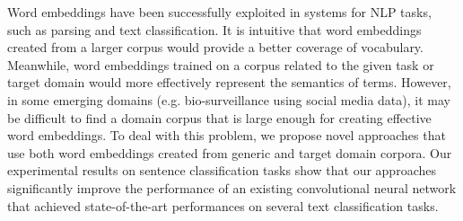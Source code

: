 Word embeddings have been successfully exploited in systems for NLP tasks, such as parsing and text classification. It is intuitive that word embeddings created from a larger corpus would provide a better coverage of vocabulary. Meanwhile, word embeddings trained on a corpus related to the given task or target domain would more effectively represent the semantics of terms. However, in some emerging domains (e.g. bio-surveillance using social media data), it may be difficult to find a domain corpus that is large enough for creating effective word embeddings. To deal with this problem, we propose novel approaches that use both word embeddings created from generic and target domain corpora. Our experimental results on sentence classification tasks show that our approaches significantly improve the performance of an existing convolutional neural network that achieved state-of-the-art performances on several text classification tasks.
